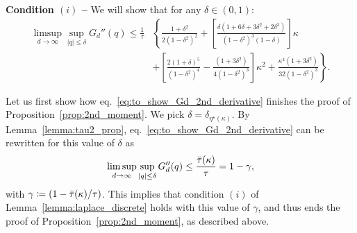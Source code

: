 \myskip
\textbf{Condition $(i)$ --}
We will show that for any $\delta \in (0,1)$:
\begin{align}\label{eq:to_show_Gd_2nd_derivative}
    \nonumber
    \limsup_{d \to \infty}\sup_{|q| \leq \delta} G_d''(q) \leq 
    \frac{1}{\tau} &\left\{\frac{1+\delta^2}{2(1-\delta^2)^2}
    + \left[\frac{\delta(1+6\delta+3\delta^2+2\delta^3)}{(1-\delta^2)^3(1-\delta)}\right] \kappa \right.\\
    &
    \left.
      + \left[ \frac{2(1+\delta)^5}{(1-\delta^2)^4} - \frac{(1+3 \delta^2)}{4(1-\delta^2)^3}\right] \kappa^2 
      + \frac{\kappa^4(1+3\delta^2)}{32(1-\delta^2)^3}\right\}.
\end{align}

\myskip
Let us first show how eq.~\eqref{eq:to_show_Gd_2nd_derivative} finishes the proof of Proposition~\ref{prop:2nd_moment}. 
We pick $\delta = \delta_{\eta^\star(\kappa)}$. 
By Lemma~\ref{lemma:tau2_prop}, eq.~\eqref{eq:to_show_Gd_2nd_derivative} can be rewritten for this value of $\delta$ 
as 
\begin{align*}
    \limsup_{d \to \infty}\sup_{|q| \leq \delta} G_d''(q) \leq 
    \frac{{\bar{\tau}}(\kappa)}{\tau} = 1 - \gamma,
\end{align*}
with $\gamma \coloneqq (1 - {\bar{\tau}}(\kappa)/\tau)$.
This implies that condition $(i)$ of Lemma~\ref{lemma:laplace_discrete} holds with this value of $\gamma$, 
and thus ends the proof of Proposition~\ref{prop:2nd_moment}, as described above.

